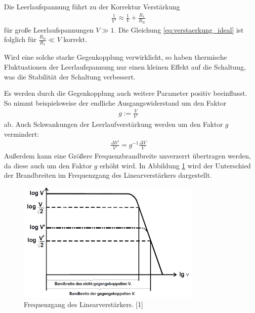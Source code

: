 \documentclass[]{scrartcl}
\begin{document}
Die Leerlaufspannung führt zu der Korrektur Verstärkung
\begin{align}
\frac{1}{V'}\approx \frac{1}{V} + \frac{R_{1}}{R_{\text{N}}}
\end{align}
für große Leerlaufspannungen $V \gg 1$. Die Gleichung \ref{eq:verstaerkung_ideal} ist folglich für $\frac{R_{\text{N}}}{R_{1}} \ll V$ korrekt.

Wird eine solche starke Gegenkopplung verwirklicht, so haben thermische Fluktuationen der Leerlaufspannung nur einen kleinen Effekt auf die Schaltung, was die Stabilität der Schaltung verbessert.

Es werden durch die Gegenkopplung auch weitere Parameter positiv beeinflusst. So nimmt beispielsweise der endliche Ausgangswiderstand um den Faktor
\begin{align}
g:=\frac{V}{V'}
\end{align}
ab. Auch Schwankungen der Leerlaufverstärkung werden um den Faktor $g$ vermindert:
\begin{align}
\frac{\Delta V'}{V'}=g^{-1}\frac{\Delta V}{V}
\end{align}
Außerdem kann eine Größere Frequenzbrandbreite unverzerrt übertragen werden, da diese auch um den Faktor $g$ erhöht wird. In Abbildung \ref{fig:frequenzgang_operationsverstaerker} wird der Unterschied der Brandbreiten im Frequenzgang des Linearverstärkers dargestellt.
\begin{figure}[H]
\centering
\includegraphics[width=9cm]{images/frequenzgang_operationsverstaerker.png}
\caption{Frequenzgang des Linearverstärkers. [1]}
\label{fig:frequenzgang_operationsverstaerker}
\end{figure}
\end{document}
